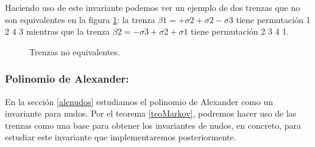 \documentclass[14pt]{extarticle}
\begin{document}
Haciendo uso de este invariante podemos ver un ejemplo de dos trenzas que no son equivalentes en la figura \ref{perm2}: la trenza $\beta1 = +\sigma2+\sigma2-\sigma3$ tiene permutación 1 2 4 3 mientras que la trenza $\beta2 = -\sigma3+\sigma2+\sigma1$ tiene permutación 2 3 4 1.\\ 
	\begin{figure}[h!]
		\centering
		\caption{Trenzas no equivalentes.}
		\label{perm2} 
	\end{figure}


\bigskip
\subsubsection{Polinomio de Alexander:}\label{invtren3}
En la sección \ref{alenudos} estudiamos el polinomio de Alexander como un invariante para nudos. Por el teorema \ref{teoMarkov}, podremos hacer uso de las trenzas como una base para obtener los invariantes de nudos, en concreto, para estudiar este invariante que implementaremos posteriormente. \\
\end{document}
